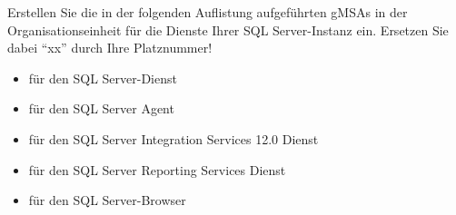 \item Erstellen Sie die in der folgenden Auflistung aufgeführten gMSAs in der
Organisationseinheit  für die Dienste Ihrer SQL Server-Instanz
ein. Ersetzen Sie dabei \enquote{xx} durch Ihre Platznummer!
\begin{itemize}
    \item {} für den SQL Server-Dienst
    \item {} für den SQL Server Agent
    \item {} für den SQL Server Integration
    Services 12.0 Dienst
    \item {} für den SQL Server Reporting Services
    Dienst
    \item {} für den SQL Server-Browser
\end{itemize}
